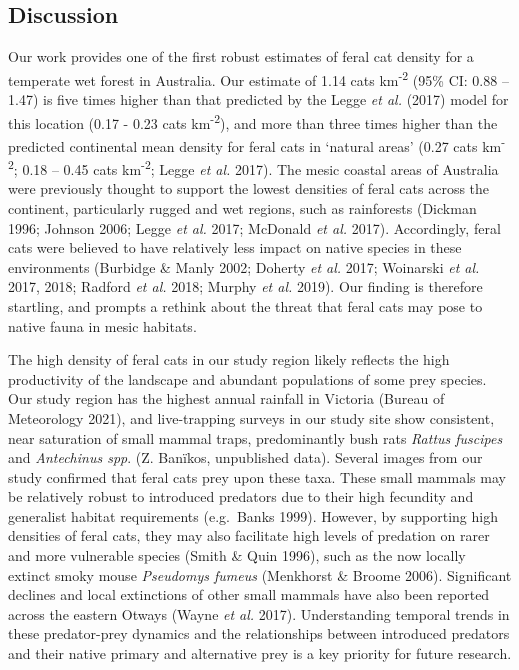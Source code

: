 \documentclass[11pt,a4paper,titlepage,twoside,openright]{style/unimelbthesis}
\begin{document}
\begin{mainmatter}
{\section{Discussion}\label{discussion-2}}

Our work provides one of the first robust estimates of feral cat density for a temperate wet forest in Australia. Our estimate of 1.14 cats km\textsuperscript{-2} (95\% CI: 0.88 -- 1.47) is five times higher than that predicted by the Legge \emph{et al.} (2017) model for this location (0.17 - 0.23 cats km\textsuperscript{-2}), and more than three times higher than the predicted continental mean density for feral cats in `natural areas' (0.27 cats km\textsuperscript{-2}; 0.18 -- 0.45 cats km\textsuperscript{-2}; Legge \emph{et al.} 2017). The mesic coastal areas of Australia were previously thought to support the lowest densities of feral cats across the continent, particularly rugged and wet regions, such as rainforests (Dickman 1996; Johnson 2006; Legge \emph{et al.} 2017; McDonald \emph{et al.} 2017). Accordingly, feral cats were believed to have relatively less impact on native species in these environments (Burbidge \& Manly 2002; Doherty \emph{et al.} 2017; Woinarski \emph{et al.} 2017, 2018; Radford \emph{et al.} 2018; Murphy \emph{et al.} 2019). Our finding is therefore startling, and prompts a rethink about the threat that feral cats may pose to native fauna in mesic habitats.

The high density of feral cats in our study region likely reflects the high productivity of the landscape and abundant populations of some prey species. Our study region has the highest annual rainfall in Victoria (Bureau of Meteorology 2021), and live-trapping surveys in our study site show consistent, near saturation of small mammal traps, predominantly bush rats \emph{Rattus fuscipes} and \emph{Antechinus spp}. (Z. Banïkos, unpublished data). Several images from our study confirmed that feral cats prey upon these taxa. These small mammals may be relatively robust to introduced predators due to their high fecundity and generalist habitat requirements (e.g.~Banks 1999). However, by supporting high densities of feral cats, they may also facilitate high levels of predation on rarer and more vulnerable species (Smith \& Quin 1996), such as the now locally extinct smoky mouse \emph{Pseudomys fumeus} (Menkhorst \& Broome 2006). Significant declines and local extinctions of other small mammals have also been reported across the eastern Otways (Wayne \emph{et al.} 2017). Understanding temporal trends in these predator-prey dynamics and the relationships between introduced predators and their native primary and alternative prey is a key priority for future research.


\end{mainmatter}
\end{document}
